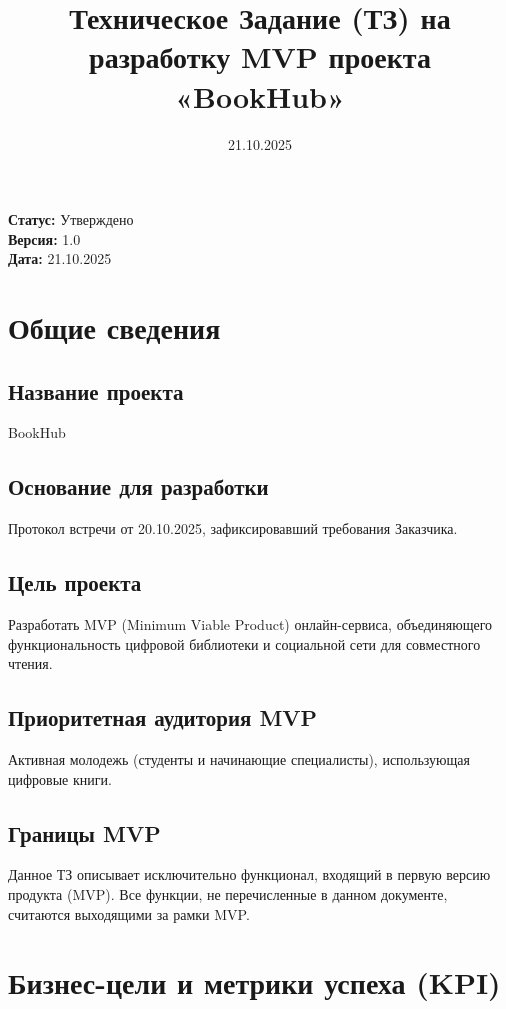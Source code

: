 \documentclass[12pt,a4paper]{article}
\title{\textbf{Техническое Задание (ТЗ) на разработку MVP проекта «BookHub»}}
\author{}
\date{21.10.2025}
\begin{document}
\maketitle

\vspace{1cm}

\begin{center}
\textbf{Статус:} Утверждено \\
\textbf{Версия:} 1.0 \\
\textbf{Дата:} 21.10.2025
\end{center}

\vspace{1cm}

\section{Общие сведения}

\subsection{Название проекта}
BookHub

\subsection{Основание для разработки}
Протокол встречи от 20.10.2025, зафиксировавший требования Заказчика.

\subsection{Цель проекта}
Разработать MVP (Minimum Viable Product) онлайн-сервиса, объединяющего функциональность цифровой библиотеки и социальной сети для совместного чтения.

\subsection{Приоритетная аудитория MVP}
Активная молодежь (студенты и начинающие специалисты), использующая цифровые книги.

\subsection{Границы MVP}
Данное ТЗ описывает исключительно функционал, входящий в первую версию продукта (MVP). Все функции, не перечисленные в данном документе, считаются выходящими за рамки MVP.

\section{Бизнес-цели и метрики успеха (KPI)}
\end{document}
